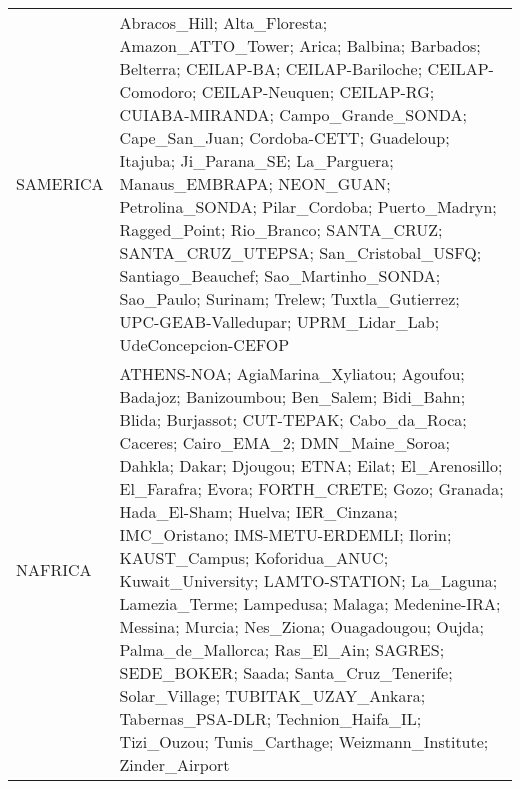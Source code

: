 \begin{table}
\begin{tabularx}{\textwidth}{lX}
  SAMERICA  & Abracos\_Hill; Alta\_Floresta; Amazon\_ATTO\_Tower; Arica; Balbina; Barbados; Belterra; CEILAP-BA; CEILAP-Bariloche; CEILAP-Comodoro; CEILAP-Neuquen; CEILAP-RG; CUIABA-MIRANDA; Campo\_Grande\_SONDA; Cape\_San\_Juan; Cordoba-CETT; Guadeloup; Itajuba; Ji\_Parana\_SE; La\_Parguera; Manaus\_EMBRAPA; NEON\_GUAN; Petrolina\_SONDA; Pilar\_Cordoba; Puerto\_Madryn; Ragged\_Point; Rio\_Branco; SANTA\_CRUZ; SANTA\_CRUZ\_UTEPSA; San\_Cristobal\_USFQ; Santiago\_Beauchef; Sao\_Martinho\_SONDA; Sao\_Paulo; Surinam; Trelew; Tuxtla\_Gutierrez; UPC-GEAB-Valledupar; UPRM\_Lidar\_Lab; UdeConcepcion-CEFOP                                                                                                                                                                                                                                                                                                                                                                                                                                                                                                                                                                                                                                                                                                                                                                                                                                               \\
  NAFRICA   & ATHENS-NOA; AgiaMarina\_Xyliatou; Agoufou; Badajoz; Banizoumbou; Ben\_Salem; Bidi\_Bahn; Blida; Burjassot; CUT-TEPAK; Cabo\_da\_Roca; Caceres; Cairo\_EMA\_2; DMN\_Maine\_Soroa; Dahkla; Dakar; Djougou; ETNA; Eilat; El\_Arenosillo; El\_Farafra; Evora; FORTH\_CRETE; Gozo; Granada; Hada\_El-Sham; Huelva; IER\_Cinzana; IMC\_Oristano; IMS-METU-ERDEMLI; Ilorin; KAUST\_Campus; Koforidua\_ANUC; Kuwait\_University; LAMTO-STATION; La\_Laguna; Lamezia\_Terme; Lampedusa; Malaga; Medenine-IRA; Messina; Murcia; Nes\_Ziona; Ouagadougou; Oujda; Palma\_de\_Mallorca; Ras\_El\_Ain; SAGRES; SEDE\_BOKER; Saada; Santa\_Cruz\_Tenerife; Solar\_Village; TUBITAK\_UZAY\_Ankara; Tabernas\_PSA-DLR; Technion\_Haifa\_IL; Tizi\_Ouzou; Tunis\_Carthage; Weizmann\_Institute; Zinder\_Airport                                                                                                                                                                                                                                                                                                                                                                                                                                                                                                                                                                                                                                                                 \\

\end{tabularx}
\end{table}
